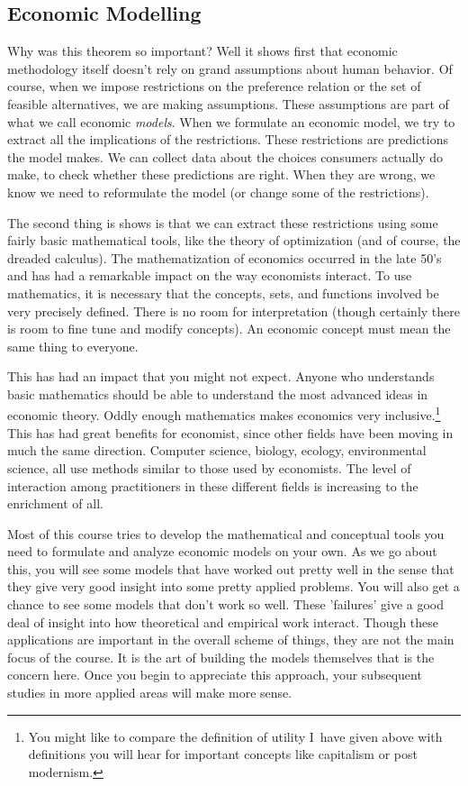 \documentclass[12pt]{article}
\begin{document}
\subsection{Economic Modelling}

Why was this theorem so important? Well it shows first that economic
methodology itself doesn't rely on grand assumptions about human behavior. Of
course, when we impose restrictions on the preference relation or the set of
feasible alternatives, we are making assumptions. These assumptions are part
of what we call economic \emph{models}. When we formulate an economic model,
we try to extract all the implications of the restrictions. These restrictions
are predictions the model makes. We can collect data about the choices
consumers actually do make, to check whether these predictions are right. When
they are wrong, we know we need to reformulate the model (or change some of
the restrictions).

The second thing is shows is that we can extract these restrictions using some
fairly basic mathematical tools, like the theory of optimization (and of
course, the dreaded calculus). The mathematization of economics occurred in
the late 50's and has had a remarkable impact on the way economists interact.
To use mathematics, it is necessary that the concepts, sets, and functions
involved be very precisely defined. There is no room for interpretation
(though certainly there is room to fine tune and modify concepts). An economic
concept must mean the same thing to everyone.

This has had an impact that you might not expect. Anyone who understands basic
mathematics should be able to understand the most advanced ideas in economic
theory. Oddly enough mathematics makes economics very inclusive.\footnote{You
might like to compare the definition of utility I\ have given above with
definitions you will hear for important concepts like capitalism or post
modernism.} This has had great benefits for economist, since other fields have
been moving in much the same direction. Computer science, biology, ecology,
environmental science, all use methods similar to those used by economists.
The level of interaction among practitioners in these different fields is
increasing to the enrichment of all.

Most of this course tries to develop the mathematical and conceptual tools you
need to formulate and analyze economic models on your own. As we go about
this, you will see some models that have worked out pretty well in the sense
that they give very good insight into some pretty applied problems. You will
also get a chance to see some models that don't work so well. These 'failures'
give a good deal of insight into how theoretical and empirical work interact.
Though these applications are important in the overall scheme of things, they
are not the main focus of the course. It is the art of building the models
themselves that is the concern here. Once you begin to appreciate this
approach, your subsequent studies in more applied areas will make more sense.
\end{document}

